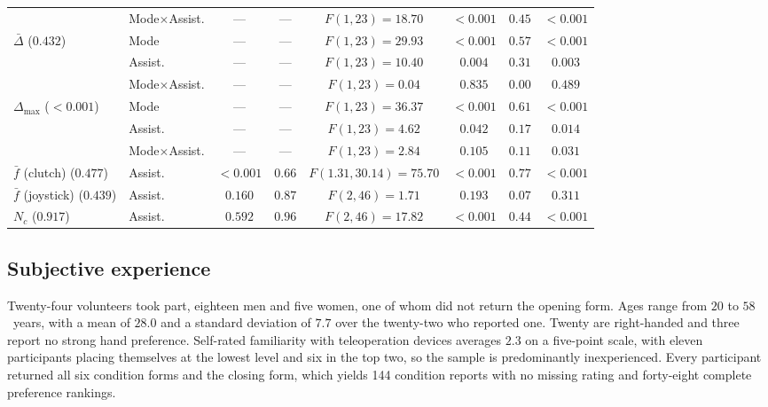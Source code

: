 \documentclass[12pt,a4paper,twoside,openright]{report}
\begin{document}
\begin{table}[p]
\begin{tabular}{@{}llcccccc@{}}
 & Mode$\times$Assist. & --- & --- & $F(1,23)=18.70$ & $<0.001$ & $0.45$ & $<0.001$ \\
\addlinespace[2pt]
$\bar{\Delta}$ ($0.432$) & Mode & --- & --- & $F(1,23)=29.93$ & $<0.001$ & $0.57$ & $<0.001$ \\
 & Assist. & --- & --- & $F(1,23)=10.40$ & $0.004$ & $0.31$ & $0.003$ \\
 & Mode$\times$Assist. & --- & --- & $F(1,23)=0.04$ & $0.835$ & $0.00$ & $0.489$ \\
\addlinespace[2pt]
$\Delta_{\max}$ ($<0.001$) & Mode & --- & --- & $F(1,23)=36.37$ & $<0.001$ & $0.61$ & $<0.001$ \\
 & Assist. & --- & --- & $F(1,23)=4.62$ & $0.042$ & $0.17$ & $0.014$ \\
 & Mode$\times$Assist. & --- & --- & $F(1,23)=2.84$ & $0.105$ & $0.11$ & $0.031$ \\
\addlinespace[2pt]
$\bar{f}$ (clutch) ($0.477$) & Assist. & $<0.001$ & $0.66$ & $F(1.31,30.14)=75.70$ & $<0.001$ & $0.77$ & $<0.001$ \\
\addlinespace[2pt]
$\bar{f}$ (joystick) ($0.439$) & Assist. & $0.160$ & $0.87$ & $F(2,46)=1.71$ & $0.193$ & $0.07$ & $0.311$ \\
\addlinespace[2pt]
$N_c$ ($0.917$) & Assist. & $0.592$ & $0.96$ & $F(2,46)=17.82$ & $<0.001$ & $0.44$ & $<0.001$ \\
\bottomrule
\end{tabular}
\end{table}

\FloatBarrier
\subsection{Subjective experience}
\label{sec:ressubj}

Twenty-four volunteers took part, eighteen men and five women, one of whom did not return the opening form. Ages range from $20$ to $58$~years, with a mean of $28.0$ and a standard deviation of $7.7$ over the twenty-two who reported one. Twenty are right-handed and three report no strong hand preference. Self-rated familiarity with teleoperation devices averages $2.3$ on a five-point scale, with eleven participants placing themselves at the lowest level and six in the top two, so the sample is predominantly inexperienced. Every participant returned all six condition forms and the closing form, which yields 144 condition reports with no missing rating and forty-eight complete preference rankings.
\end{document}
